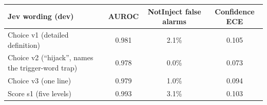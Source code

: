 \begin{tabular}{lccc}
\toprule
Jev wording (dev) & AUROC & NotInject false alarms & Confidence ECE \\
\midrule
Choice v1 (detailed definition) & 0.981 & 2.1\% & 0.105 \\
Choice v2 (``hijack'', names the trigger-word trap) & 0.978 & 0.0\% & 0.073 \\
Choice v3 (one line) & 0.979 & 1.0\% & 0.094 \\
Score s1 (five levels) & 0.993 & 3.1\% & 0.103 \\
\bottomrule
\end{tabular}
